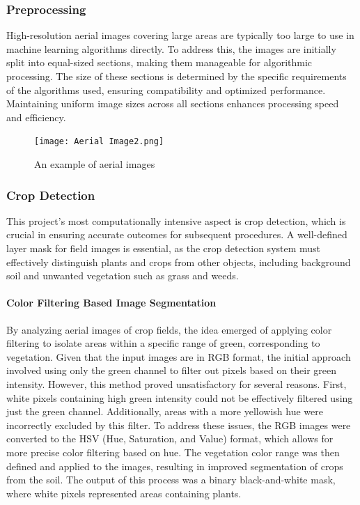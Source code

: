 \documentclass[conference]{IEEEtran}
\begin{document}
\subsubsection{Preprocessing}
High-resolution aerial images covering large areas are typically too large to use in machine learning algorithms directly. To address this, the images are initially split into equal-sized sections, making them manageable for algorithmic processing. The size of these sections is determined by the specific requirements of the algorithms used, ensuring compatibility and optimized performance. Maintaining uniform image sizes across all sections enhances processing speed and efficiency.

\begin{figure}[htbp]
\texttt{[image: Aerial Image2.png]}
\caption{An example of aerial images}
\label{fig1}
\end{figure}

\subsubsection{Crop Detection}
This project's most computationally intensive aspect is crop detection, which is crucial in ensuring accurate outcomes for subsequent procedures. A well-defined layer mask for field images is essential, as the crop detection system must effectively distinguish plants and crops from other objects, including background soil and unwanted vegetation such as grass and weeds. 

\paragraph{Color Filtering Based Image Segmentation}
By analyzing aerial images of crop fields, the idea emerged of applying color filtering to isolate areas within a specific range of green, corresponding to vegetation. Given that the input images are in RGB format, the initial approach involved using only the green channel to filter out pixels based on their green intensity. However, this method proved unsatisfactory for several reasons. First, white pixels containing high green intensity could not be effectively filtered using just the green channel. Additionally, areas with a more yellowish hue were incorrectly excluded by this filter. To address these issues, the RGB images were converted to the HSV (Hue, Saturation, and Value) format, which allows for more precise color filtering based on hue. The vegetation color range was then defined and applied to the images, resulting in improved segmentation of crops from the soil. The output of this process was a binary black-and-white mask, where white pixels represented areas containing plants.
\end{document}
